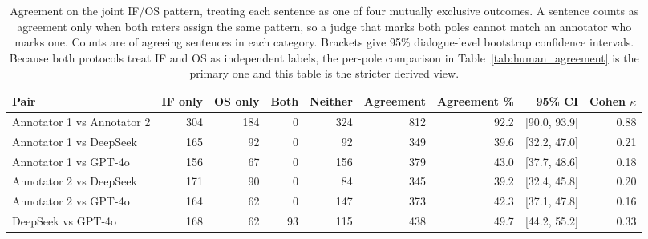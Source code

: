 \begin{table}[t]
\centering
\small
\caption{Agreement on the joint IF/OS pattern, treating each sentence as one of four mutually exclusive outcomes. A sentence counts as agreement only when both raters assign the same pattern, so a judge that marks both poles cannot match an annotator who marks one. Counts are of agreeing sentences in each category. Brackets give 95\% dialogue-level bootstrap confidence intervals. Because both protocols treat IF and OS as independent labels, the per-pole comparison in Table~\ref{tab:human_agreement} is the primary one and this table is the stricter derived view.}
\label{tab:human_joint_pattern}
\begin{tabular}{lrrrrrrrr}
\toprule
Pair & IF only & OS only & Both & Neither & Agreement & Agreement \% & 95\% CI & Cohen $\kappa$ \\
\midrule
Annotator 1 vs Annotator 2 & 304 & 184 & 0 & 324 & 812 & 92.2 & [90.0, 93.9] & 0.88 \\
Annotator 1 vs DeepSeek & 165 & 92 & 0 & 92 & 349 & 39.6 & [32.2, 47.0] & 0.21 \\
Annotator 1 vs GPT-4o & 156 & 67 & 0 & 156 & 379 & 43.0 & [37.7, 48.6] & 0.18 \\
Annotator 2 vs DeepSeek & 171 & 90 & 0 & 84 & 345 & 39.2 & [32.4, 45.8] & 0.20 \\
Annotator 2 vs GPT-4o & 164 & 62 & 0 & 147 & 373 & 42.3 & [37.1, 47.8] & 0.16 \\
DeepSeek vs GPT-4o & 168 & 62 & 93 & 115 & 438 & 49.7 & [44.2, 55.2] & 0.33 \\
\bottomrule
\end{tabular}
\end{table}
